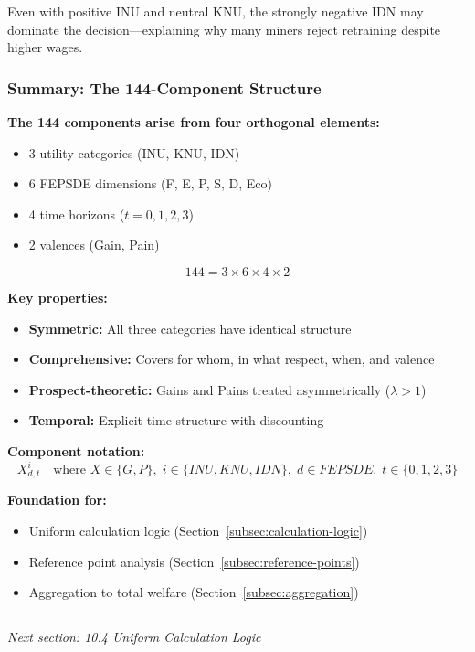Even with positive INU and neutral KNU, the strongly negative IDN 
may dominate the decision---explaining why many miners reject retraining 
despite higher wages.

\subsubsection{Summary: The 144-Component Structure}

\begin{tcolorbox}[colback=gray!5!white, colframe=gray!75!black, title=Section 10.3 Summary]
\textbf{The 144 components arise from four orthogonal elements:}
\begin{itemize}
\item 3 utility categories (INU, KNU, IDN)
\item 6 FEPSDE dimensions (F, E, P, S, D, Eco)
\item 4 time horizons ($t = 0, 1, 2, 3$)
\item 2 valences (Gain, Pain)
\end{itemize}

$$144 = 3 \times 6 \times 4 \times 2$$

\textbf{Key properties:}
\begin{itemize}
\item \textbf{Symmetric:} All three categories have identical structure
\item \textbf{Comprehensive:} Covers for whom, in what respect, when, and valence
\item \textbf{Prospect-theoretic:} Gains and Pains treated asymmetrically ($\lambda > 1$)
\item \textbf{Temporal:} Explicit time structure with discounting
\end{itemize}

\textbf{Component notation:}
$$X^i_{d,t} \quad \text{where } X \in \{G, P\}, \; i \in \{INU, KNU, IDN\}, \; d \in FEPSDE, \; t \in \{0,1,2,3\}$$

\textbf{Foundation for:}
\begin{itemize}
\item Uniform calculation logic (Section~\ref{subsec:calculation-logic})
\item Reference point analysis (Section~\ref{subsec:reference-points})
\item Aggregation to total welfare (Section~\ref{subsec:aggregation})
\end{itemize}
\end{tcolorbox}

\vspace{1em}
\hrule
\vspace{0.5em}
\noindent\textit{Next section: 10.4 Uniform Calculation Logic}

